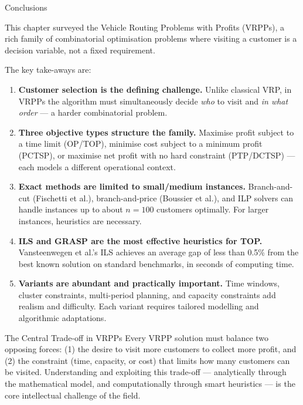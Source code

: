\documentclass[aspectratio=169,10pt]{beamer}
\begin{document}
\begin{frame}[allowframebreaks]{Conclusions}

  This chapter surveyed the Vehicle Routing Problems with Profits (VRPPs),
  a rich family of combinatorial optimisation problems where visiting a
  customer is a decision variable, not a fixed requirement.

  \medskip
  The key take-aways are:

  \begin{enumerate}
    \item \textbf{Customer selection is the defining challenge.}
          Unlike classical VRP, in VRPPs the algorithm must simultaneously
          decide \emph{who} to visit and \emph{in what order} --- a
          harder combinatorial problem.

    \item \textbf{Three objective types structure the family.}
          Maximise profit subject to a time limit (OP/TOP),
          minimise cost subject to a minimum profit (PCTSP), or maximise
          net profit with no hard constraint (PTP/DCTSP) --- each models
          a different operational context.

    \item \textbf{Exact methods are limited to small/medium instances.}
          Branch-and-cut (Fischetti et al.), branch-and-price (Boussier
          et al.), and ILP solvers can handle instances up to about
          $n = 100$ customers optimally.
          For larger instances, heuristics are necessary.

    \item \textbf{ILS and GRASP are the most effective heuristics for TOP.}
          Vansteenwegen et al.'s ILS achieves an average gap of less than
          0.5\% from the best known solution on standard benchmarks, in
          seconds of computing time.

    \item \textbf{Variants are abundant and practically important.}
          Time windows, cluster constraints, multi-period planning,
          and capacity constraints add realism and difficulty.
          Each variant requires tailored modelling and algorithmic
          adaptations.
  \end{enumerate}

  \framebreak

  \begin{alertblock}{The Central Trade-off in VRPPs}
    Every VRPP solution must balance two opposing forces:
    (1) the desire to visit more customers to collect more profit, and
    (2) the constraint (time, capacity, or cost) that limits how many
    customers can be visited.
    Understanding and exploiting this trade-off --- analytically through
    the mathematical model, and computationally through smart heuristics ---
    is the core intellectual challenge of the field.
  \end{alertblock}

\end{frame}
\end{document}
